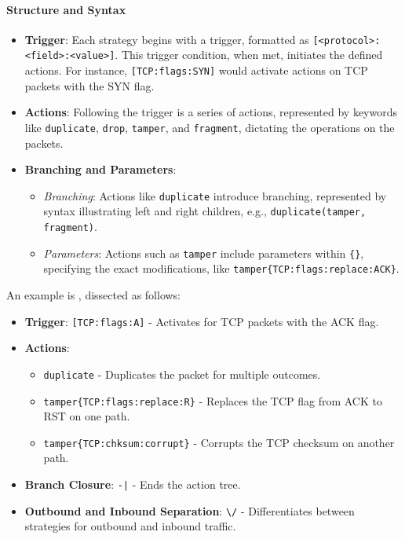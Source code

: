 \documentclass[12pt, fleqn, a4paper]{article}
\begin{document}
\paragraph{Structure and Syntax}
\begin{itemize}
    \item \textbf{Trigger}: Each strategy begins with a trigger, formatted as \texttt{[<protocol>:<field>:<value>]}. This trigger condition, when met, initiates the defined actions. For instance, \texttt{[TCP:flags:SYN]} would activate actions on TCP packets with the SYN flag.

    \item \textbf{Actions}: Following the trigger is a series of actions, represented by keywords like \texttt{duplicate}, \texttt{drop}, \texttt{tamper}, and \texttt{fragment}, dictating the operations on the packets.

    \item \textbf{Branching and Parameters}:
    \begin{itemize}
        \item \textit{Branching}: Actions like \texttt{duplicate} introduce branching, represented by syntax illustrating left and right children, e.g., \texttt{duplicate(tamper{}, fragment{})}.
        \item \textit{Parameters}: Actions such as \texttt{tamper} include parameters within \texttt{\{\}}, specifying the exact modifications, like \texttt{tamper\{TCP:flags:replace:ACK\}}.
    \end{itemize}
\end{itemize}

An example is 
, dissected as follows:
\begin{itemize}
    \item \textbf{Trigger}: \texttt{[TCP:flags:A]} - Activates for TCP packets with the ACK flag.
    \item \textbf{Actions}:
    \begin{itemize}
        \item \texttt{duplicate} - Duplicates the packet for multiple outcomes.
        \item \texttt{tamper\{TCP:flags:replace:R\}} - Replaces the TCP flag from ACK to RST on one path.
        \item \texttt{tamper\{TCP:chksum:corrupt\}} - Corrupts the TCP checksum on another path.
    \end{itemize}
    \item \textbf{Branch Closure}: \texttt{-|} - Ends the action tree.
    \item \textbf{Outbound and Inbound Separation}: \texttt{\textbackslash/} - Differentiates between strategies for outbound and inbound traffic.
\end{itemize}
\end{document}
